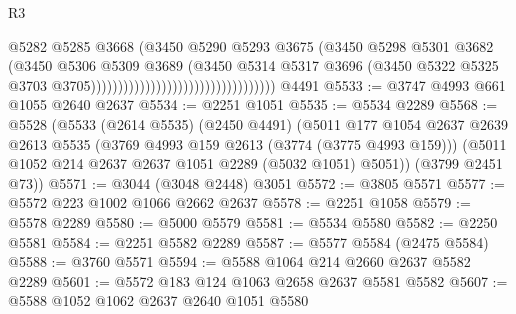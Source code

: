 \begin{lexlean}{R3}
\begin{coremodule}
                                                              @5282
                                                              @5285
                                                              @3668
                                                              (@3450
                                                                @5290
                                                                @5293
                                                                @3675
                                                                (@3450
                                                                  @5298
                                                                  @5301
                                                                  @3682
                                                                  (@3450
                                                                    @5306
                                                                    @5309
                                                                    @3689
                                                                    (@3450
                                                                      @5314
                                                                      @5317
                                                                      @3696
                                                                      (@3450
                                                                        @5322
                                                                        @5325
                                                                        @3703
                                                                        @3705))))))))))))))))))))))))))))))))))
    @4491
@5533 := @3747 @4993 @661 @1055 @2640 @2637
@5534 := @2251 @1051
@5535 := @5534 @2289
@5568 := @5528
    (@5533
      (@2614 @5535)
      (@2450 @4491)
      (@5011
        @177
        @1054
        @2637
        @2639
        @2613
        @5535
        (@3769 @4993 @159 @2613 (@3774 (@3775 @4993 @159)))
        (@5011 @1052 @214 @2637 @2637 @1051 @2289 (@5032 @1051) @5051))
      (@3799 @2451 @73))
@5571 := @3044 (@3048 @2448) @3051
@5572 := @3805 @5571
@5577 := @5572 @223 @1002 @1066 @2662 @2637
@5578 := @2251 @1058
@5579 := @5578 @2289
@5580 := @5000 @5579
@5581 := @5534 @5580
@5582 := @2250 @5581
@5584 := @2251 @5582 @2289
@5587 := @5577 @5584 (@2475 @5584)
@5588 := @3760 @5571
@5594 := @5588 @1064 @214 @2660 @2637 @5582 @2289
@5601 := @5572 @183 @124 @1063 @2658 @2637 @5581 @5582
@5607 := @5588 @1052 @1062 @2637 @2640 @1051 @5580

\end{coremodule}
\end{lexlean}
